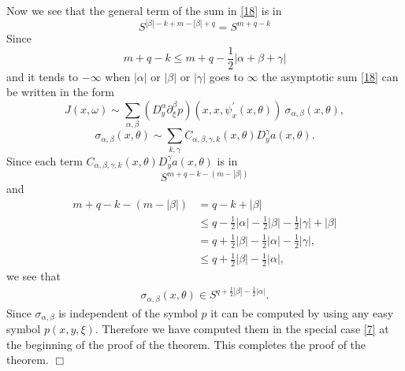 \documentclass[12pt,reqno]{amsart}
\theoremstyle{plain}  %
\theoremstyle{definition}
\begin{document}
Now we see that the general term of the sum in \eqref{18} is in
$$S^{|\beta| - k + m - |\beta| + q} = S^{m+q-k}$$
Since
$$m+q-k \le m + q - \frac{1}{2} |\alpha + \beta + \gamma|$$
and it tends to $ - \infty $ when $ |\alpha| $ or $ |\beta|$ or $ |\gamma| $ goes to
$ \infty $ the asymptotic sum \eqref{18} can be written in the form
\begin{equation}
	\label{19}
	J(x, \omega) \sim \sum_{\alpha, \beta} \left ( D^\alpha_y
\partial^\beta_\xi p \right ) (x, x, \psi^\prime_x (x, \theta)) \
\sigma_{\alpha, \beta} (x, \theta), 
\end{equation}
\begin{equation}
	\label{20}
	\sigma_{\alpha, \beta} (x, \theta) \sim \sum_{k, \gamma} C_{\alpha, \beta,
\gamma, k} (x, \theta) D^\gamma_y a(x, \theta). 
\end{equation}
Since each term $ C_{\alpha, \beta, \gamma, k} (x, \theta) D^\gamma_ya (x,
\theta) $ is in
$$S^{m+q-k-(m -|\beta|)} $$
and
\begin{equation*}
	\begin{split}
m+q-k-(m - |\beta|) &= q - k + |\beta| \\
&\le q - \frac{1}{2} |\alpha| - \frac{1}{2} |\beta| - \frac{1}{2} |\gamma| + |\beta|\\
&= q + \frac{1}{2} |\beta| - \frac{1}{2} |\alpha| - \frac{1}{2} |\gamma|, \\
&\le q + \frac{1}{2} |\beta| - \frac{1}{2} |\alpha|, \end{split}
\end{equation*}
we see that
\begin{equation*}
	\begin{split}
	\sigma_{\alpha, \beta} (x, \theta) \in S^{q + \frac{1}{2} |\beta| - \frac{1}{2}
|\alpha|}. 
\end{split}
\end{equation*}
Since $ \sigma_{\alpha, \beta} $ is independent of the symbol $ p $ it can be
computed by using any easy symbol $ p(x, y, \xi)$.  Therefore we have
computed them in the special case \eqref{7} at the beginning of the proof of the
theorem.  This completes the proof of the theorem. $\Box$
%
\end{document}
